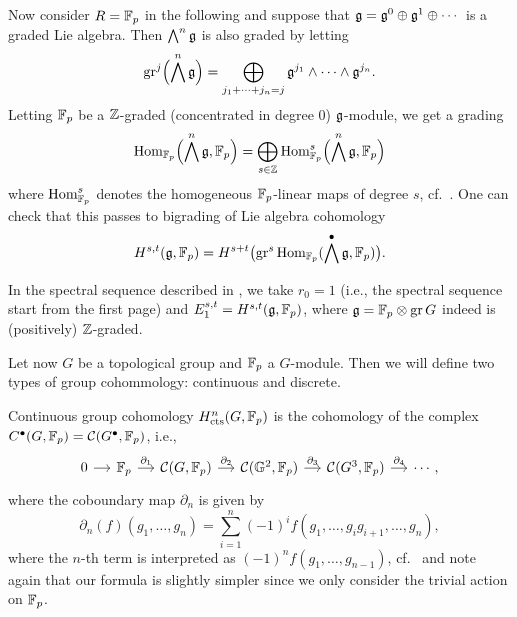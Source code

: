 Now consider $R=\mathbb{F}_{p}$ in the following and suppose that $\mathfrak{g} = \mathfrak{g}^0 \oplus \mathfrak{g}^1 \oplus \dotsb$ is a graded Lie algebra. Then $\bigwedge^n \mathfrak{g}$ is also graded by letting
\[
  \operatorname{gr}^j\Bigl( \bigwedge^n \mathfrak{g} \Bigr) = \bigoplus_{j_1+\dotsb+j_n = j} \mathfrak{g}^{j_1} \wedge \dotsb \wedge \mathfrak{g}^{j_n}.
\]
Letting $\mathbb{F}_{p}$ be a $\mathbb{Z}$-graded (concentrated in degree $0$) $\mathfrak{g}$-module, we get a grading
\[
  \operatorname{Hom}_{\mathbb{F}_{p}}\Bigl( \bigwedge^n \mathfrak{g}, \mathbb{F}_{p} \Bigr) = \bigoplus_{s \in \mathbb{Z}} \operatorname{Hom}_{\mathbb{F}_{p}}^s\Bigl( \bigwedge^n\mathfrak{g}, \mathbb{F}_{p} \Bigr)
\]
where $\operatorname{Hom}_{\mathbb{F}_{p}}^s$ denotes the homogeneous $\mathbb{F}_{p}$-linear maps of degree $s$, cf.\ \cite[Lem.~4.2]{Fossum}. One can check that this passes to bigrading of Lie algebra cohomology
\begin{equation*}
  H^{s,t}(\mathfrak{g}, \mathbb{F}_{p}) = H^{s+t}\bigl( \operatorname{gr}^s \operatorname{Hom}_{\mathbb{F}_{p}}(\bigwedge^{\bullet} \mathfrak{g}, \mathbb{F}_{p}) \bigr).
\end{equation*}%
%

In the spectral sequence described in \cite[§6.1]{Sor}, we take $r_{0} = 1$ (i.e., the spectral sequence start from the first page) and $E_{1}^{s,t} = H^{s,t}(\mathfrak{g}, \mathbb{F}_{p})$, where $\mathfrak{g} = \mathbb{F}_{p} \otimes \operatorname{gr} G$ indeed is (positively) $\mathbb{Z}$-graded.

Let now $G$ be a topological group and $\mathbb{F}_{p}$ a $G$-module. Then we will define two types of group cohommology: continuous and discrete.

Continuous group cohomology $H_{\mathrm{cts}}^{n}(G,\mathbb{F}_{p})$ is the cohomology of the complex $C^{\bullet}(G,\mathbb{F}_{p}) = \mathcal{C}(G^{\bullet},\mathbb{F}_{p})$, i.e.,
\[
  \begin{tikzcd}[column sep=small,row sep=tiny]
    0 \ar[r] & \F_{p} \ar[r,"\partial_{1}"] & \Cont(G, \F_{p}) \ar[r,"\partial_{2}"] & \Cont(\G^{2}, \F_{p}) \ar[r,"\partial_{3}"] &  \Cont(G^{3},\F_{p}) \ar[r,"\partial_{4}"] & \cdots,
  \end{tikzcd}
\]
where the coboundary map $\partial_{n}$ is given by
\begin{equation*}
  \partial_{n}(f)(g_{1},\dotsc,g_{n}) = \sum_{i=1}^{n}(-1)^{i}f(g_{1},\dotsc,g_{i}g_{i+1},\dotsc,g_{n}),
\end{equation*}
where the $n$-th term is interpreted as $(-1)^{n}f(g_{1},\dotsc,g_{n-1})$, cf.\ \cite[§3]{Sor} and note again that our formula is slightly simpler since we only consider the trivial action on $\mathbb{F}_{p}$.

